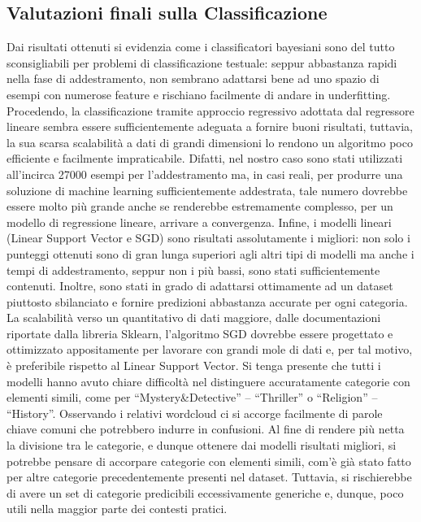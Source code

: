 \documentclass[12pt,oneside]{article}
\begin{document}
    \begin{enumerate}
    \subsection{Valutazioni finali sulla Classificazione}
    \begin{justify}
    Dai risultati ottenuti si evidenzia come i classificatori bayesiani sono del tutto sconsigliabili per problemi di classificazione testuale: seppur abbastanza rapidi nella fase di addestramento, non sembrano adattarsi bene ad uno spazio di esempi con numerose feature e rischiano facilmente di andare in underfitting.
    Procedendo, la classificazione tramite approccio regressivo adottata dal regressore lineare sembra essere sufficientemente adeguata a fornire buoni risultati, tuttavia, la sua scarsa scalabilità a dati di grandi dimensioni lo rendono un algoritmo poco efficiente e facilmente impraticabile. Difatti, nel nostro caso sono stati utilizzati all’incirca 27000 esempi per l’addestramento ma, in casi reali, per produrre una soluzione di machine learning sufficientemente addestrata, tale numero dovrebbe essere molto più grande anche se renderebbe estremamente complesso, per un modello di regressione lineare, arrivare a convergenza.
    Infine, i modelli lineari (Linear Support Vector e SGD) sono risultati assolutamente i migliori: non solo i punteggi ottenuti sono di gran lunga superiori agli altri tipi di modelli ma anche i tempi di addestramento, seppur non i più bassi, sono stati sufficientemente contenuti. Inoltre, sono stati in grado di adattarsi ottimamente ad un dataset piuttosto sbilanciato e fornire predizioni abbastanza accurate per ogni categoria. La scalabilità verso un quantitativo di dati maggiore, dalle documentazioni riportate dalla libreria Sklearn, l’algoritmo SGD dovrebbe essere progettato e ottimizzato appositamente per lavorare con grandi mole di dati e, per tal motivo, è preferibile rispetto al Linear Support Vector.
    Si tenga presente che tutti i modelli hanno avuto chiare difficoltà nel distinguere accuratamente categorie con elementi simili, come per “Mystery\&Detective” – “Thriller” o “Religion” – “History”. Osservando i relativi wordcloud ci si accorge facilmente di parole chiave comuni che potrebbero indurre in confusioni. Al fine di rendere più netta la divisione tra le categorie, e dunque ottenere dai modelli risultati migliori, si potrebbe pensare di accorpare categorie con elementi simili, com’è già stato fatto per altre categorie precedentemente presenti nel dataset. Tuttavia, si rischierebbe di avere un set di categorie predicibili eccessivamente generiche e, dunque, poco utili nella maggior parte dei contesti pratici.
    \end{justify}
    \end{enumerate}
\end{document}
